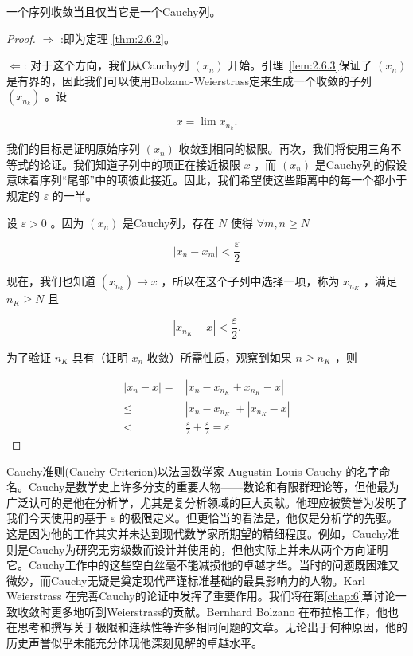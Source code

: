 \begin{Thm}[Cauchy准则]
  \label{thm:2.6.4}
  一个序列收敛当且仅当它是一个Cauchy列。
\end{Thm}

\begin{proof}
  $\Rightarrow$ :即为定理 \ref{thm:2.6.2}。

  $\Leftarrow$:  对于这个方向，我们从Cauchy列 \(\left( {x}_{n}\right)\) 开始。引理~\ref{lem:2.6.3}保证了 \(\left( {x}_{n}\right)\) 是有界的，因此我们可以使用Bolzano-Weierstrass定来生成一个收敛的子列 \(\left( {x}_{{n}_{k}}\right)\) 。设

\[
x = \lim {x}_{{n}_{k}}.
\]

我们的目标是证明原始序列 \(\left( {x}_{n}\right)\) 收敛到相同的极限。再次，我们将使用三角不等式的论证。我们知道子列中的项正在接近极限 \(x\) ，而 \(\left( {x}_{n}\right)\) 是Cauchy列的假设意味着序列“尾部”中的项彼此接近。因此，我们希望使这些距离中的每一个都小于规定的 \(\varepsilon\) 的一半。

设 \(\varepsilon  > 0\) 。因为 \(\left( {x}_{n}\right)\) 是Cauchy列，存在 \(N\) 使得 $\forall m,n \ge N$

\[
\left| {{x}_{n} - {x}_{m}}\right|  < \frac{\varepsilon }{2}
\]

现在，我们也知道 \(\left( {x}_{{n}_{k}}\right)  \rightarrow  x\) ，所以在这个子列中选择一项，称为 \({x}_{{n}_{K}}\) ，满足 \({n}_{K} \geq  N\) 且

\[
\left| {{x}_{{n}_{K}} - x}\right|  < \frac{\varepsilon }{2}.
\]

为了验证 \({n}_{K}\) 具有（证明 $x_n$ 收敛）所需性质，观察到如果 \(n \geq  {n}_{K}\) ，则

\begin{align*}
\left| {{x}_{n} - x}\right|  = & \left| {{x}_{n} - {x}_{{n}_{K}} + {x}_{{n}_{K}} - x}\right|\\
\leq&  \left| {{x}_{n} - {x}_{{n}_{K}}}\right|  + \left| {{x}_{{n}_{K}} - x}\right|\\
<& \frac{\varepsilon }{2} + \frac{\varepsilon }{2} = \varepsilon
\end{align*}

\end{proof}



Cauchy准则(Cauchy Criterion)以法国数学家 Augustin Louis Cauchy 的名字命名。Cauchy是数学史上许多分支的重要人物——数论和有限群理论等，但他最为广泛认可的是他在分析学，尤其是复分析领域的巨大贡献。他理应被赞誉为发明了我们今天使用的基于 \(\varepsilon\) 的极限定义。但更恰当的看法是，他仅是分析学的先驱。这是因为他的工作其实并未达到现代数学家所期望的精细程度。例如，Cauchy准则是Cauchy为研究无穷级数而设计并使用的，但他实际上并未从两个方向证明它。Cauchy工作中的这些空白丝毫不能减损他的卓越才华。当时的问题既困难又微妙，而Cauchy无疑是奠定现代严谨标准基础的最具影响力的人物。Karl Weierstrass 在完善Cauchy的论证中发挥了重要作用。我们将在第\ref{chap:6}章讨论一致收敛时更多地听到Weierstrass的贡献。Bernhard Bolzano 在布拉格工作，他也在思考和撰写关于极限和连续性等许多相同问题的文章。无论出于何种原因，他的历史声誉似乎未能充分体现他深刻见解的卓越水平。


